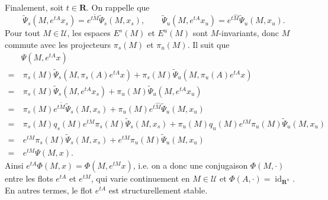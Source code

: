 \documentclass[french, 12pt]{article}
\theoremstyle{definition}
\newcommand{\wh}[1]{\widehat{#1}}
\newcommand{\wt}[1]{\widetilde{#1}}
\newcommand{\Rbb}{\mathbf{R}}
\newcommand{\Ucal}{\mathcal{U}}
\newcommand{\id}{\operatorname{id}}
\begin{document}
\begin{enumerate}
    Finalement, soit $t \in \Rbb$. On rappelle que
        $$\wt{\Psi}_s(M,e^{tA}x_s) = e^{t\wt{M}}\wt{\Psi}_s(M,x_s), \qquad \wt{\Psi}_u(M,e^{tA}x_u) = e^{t\wh{M}}\wt{\Psi}_u(M,x_u).$$
    Pour tout $M \in \Ucal$, les espaces $E^s(M)$ et $E^u(M)$ sont $M$-invariants, donc $M$ commute avec les projecteurs $\pi_s(M)$ et $\pi_u(M)$. Il suit que
        \begin{align*}
            & \Psi(M,e^{tA}x) \\
            = & \  \pi_s(M)\wt{\Psi}_s(M, \pi_s(A)e^{tA}x) + \pi_s(M)\wt{\Psi}_u(M, \pi_u(A)e^{tA}x) \\
            = & \  \pi_s(M)\wt{\Psi}_s(M, e^{tA}x_s) + \pi_u(M)\wt{\Psi}_u(M, e^{tA}x_u)\\
            = & \ \pi_s(M)e^{t\wt{M}}\wt{\Psi}_s(M,x_s) + \pi_u(M)e^{t\wh{M}}\wt{\Psi}_u(M,x_u)\\
            = & \ \pi_s(M)q_s(M)e^{tM}\pi_s(M)\wt{\Psi}_s(M,x_s) + \pi_u(M)q_u(M)e^{tM}\pi_u(M)\wt{\Psi}_u(M,x_u)\\
            = & \ e^{tM}\pi_s(M)\wt{\Psi}_s(M,x_s) + e^{tM}\pi_u(M)\wt{\Psi}_u(M,x_u)\\
            = & \ e^{tM}\Psi(M,x).
        \end{align*}
    Ainsi $e^{tA}\Phi(M,x) = \Phi(M,e^{tM}x)$, i.e. on a donc une conjugaison $\Phi(M,\cdot)$ entre les flots $e^{tA}$ et $e^{tM}$, qui varie continuement en $M \in \Ucal$ et $\Phi(A, \cdot) = \id_{\Rbb^n}$. En autres termes, le flot $e^{tA}$ est structurellement stable.
\end{enumerate}
\end{document}
